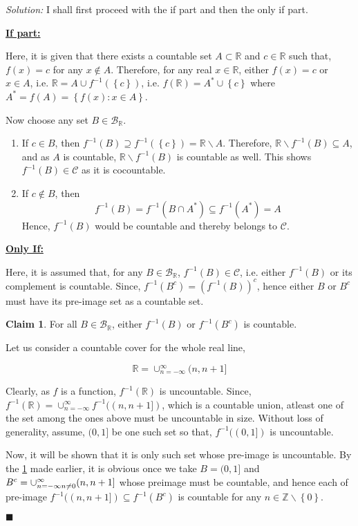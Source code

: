 \documentclass[12pt]{article}
\newcommand{\R}{\mathbb{R}}
\newcommand{\Z}{\mathbb{Z}}
\theoremstyle{definition}
\newenvironment{answer}{\textit{Solution: }\quad }{ \hfill $\blacksquare$}
\newtheorem{claim}{Claim}
\begin{document}
\begin{answer}
	I shall first proceed with the if part and then the only if part.

	\textbf{\underline{If part:}}

	Here, it is given that there exists a countable set $A \subset \R$ and $c \in \R$ such that, $f(x) = c$ for any $x \notin A$. Therefore, for any real $x \in \R$, either $f(x) = c$ or $x \in A$, i.e. $\R = A \cup f^{-1}(\left\{ c \right\})$, i.e. $f(\R) = A^\ast \cup \left\{ c \right\}$ where $A^\ast = f(A) = \left\{ f(x) : x \in A \right\}$.

	Now choose any set $B \in \mathcal{B}_{\R}$.
	\begin{enumerate}
		\item If $c \in B$, then $f^{-1}(B) \supseteq f^{-1}(\left\{ c \right\}) = \R \backslash A$. Therefore, $\R \backslash f^{-1}(B) \subseteq A$, and as $A$ is countable, $\R \backslash f^{-1}(B)$ is countable as well. This shows $f^{-1}(B) \in \mathcal{C}$ as it is cocountable.
		\item If $c \notin B$, then 
		$$f^{-1}(B) = f^{-1}(B \cap A^\ast) \subseteq f^{-1}(A^\ast) = A$$
		Hence, $f^{-1}(B)$ would be countable and thereby belongs to $\mathcal{C}$. 
	\end{enumerate}


	\textbf{\underline{Only If:}}

	Here, it is assumed that, for any $B \in \mathcal{B}_{\R}$, $f^{-1}(B) \in \mathcal{C}$, i.e. either $f^{-1}(B)$ or its complement is countable. Since, $f^{-1}(B^c) = (f^{-1}(B))^c$, hence either $B$ or $B^c$ must have its pre-image set as a countable set.

	\begin{claim}
		\label{remark:1-1}
		For all $B \in \mathcal{B}_{\R}$, either $f^{-1}(B)$ or $f^{-1}(B^c)$ is countable.
	\end{claim}

	Let us consider a countable cover for the whole real line,

	$$\R = \cup_{n = -\infty}^{\infty} (n, n+1]$$

	Clearly, as $f$ is a function, $f^{-1}(\R)$ is uncountable. Since, $f^{-1}(\R) = \cup_{n = -\infty}^{\infty} f^{-1}( (n, n+1] )$, which is a countable union, atleast one of the set among the ones above must be uncountable in size. Without loss of generality, assume, $(0, 1]$ be one such set so that, $f^{-1}((0, 1])$ is uncountable.
	
	Now, it will be shown that it is only such set whose pre-image is uncountable. By the \cref{remark:1-1} made earlier, it is obvious once we take $B = (0, 1]$ and $B^c = \cup_{n = -\infty \\ n \neq 0}^{\infty} (n, n+1]$ whose preimage must be countable, and hence each of pre-image $f^{-1}((n, n+1]) \subseteq f^{-1}(B^c)$ is countable for any $n \in \Z \backslash \left\{ 0 \right\}$.


\end{answer}
\end{document}
